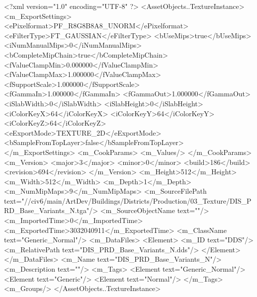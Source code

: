 <?xml version="1.0" encoding="UTF-8" ?>
<AssetObjects..TextureInstance>
	<m_ExportSettings>
		<ePixelformat>PF_R8G8B8A8_UNORM</ePixelformat>
		<eFilterType>FT_GAUSSIAN</eFilterType>
		<bUseMips>true</bUseMips>
		<iNumManualMips>0</iNumManualMips>
		<bCompleteMipChain>true</bCompleteMipChain>
		<fValueClampMin>0.000000</fValueClampMin>
		<fValueClampMax>1.000000</fValueClampMax>
		<fSupportScale>1.000000</fSupportScale>
		<fGammaIn>1.000000</fGammaIn>
		<fGammaOut>1.000000</fGammaOut>
		<iSlabWidth>0</iSlabWidth>
		<iSlabHeight>0</iSlabHeight>
		<iColorKeyX>64</iColorKeyX>
		<iColorKeyY>64</iColorKeyY>
		<iColorKeyZ>64</iColorKeyZ>
		<eExportMode>TEXTURE_2D</eExportMode>
		<bSampleFromTopLayer>false</bSampleFromTopLayer>
	</m_ExportSettings>
	<m_CookParams>
		<m_Values/>
	</m_CookParams>
	<m_Version>
		<major>3</major>
		<minor>0</minor>
		<build>186</build>
		<revision>694</revision>
	</m_Version>
	<m_Height>512</m_Height>
	<m_Width>512</m_Width>
	<m_Depth>1</m_Depth>
	<m_NumMipMaps>9</m_NumMipMaps>
	<m_SourceFilePath text="//civ6/main/ArtDev/Buildings/Districts/Production/03_Texture/DIS_PRD_Base_Variants_N.tga"/>
	<m_SourceObjectName text=""/>
	<m_ImportedTime>0</m_ImportedTime>
	<m_ExportedTime>3032040911</m_ExportedTime>
	<m_ClassName text="Generic_Normal"/>
	<m_DataFiles>
		<Element>
			<m_ID text="DDS"/>
			<m_RelativePath text="DIS_PRD_Base_Variants_N.dds"/>
		</Element>
	</m_DataFiles>
	<m_Name text="DIS_PRD_Base_Variants_N"/>
	<m_Description text=""/>
	<m_Tags>
		<Element text="Generic_Normal"/>
		<Element text="Generic"/>
		<Element text="Normal"/>
	</m_Tags>
	<m_Groups/>
</AssetObjects..TextureInstance>

